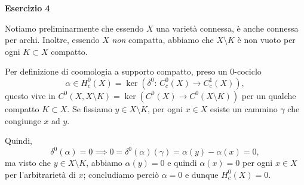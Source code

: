 \documentclass[a4paper]{article}
\theoremstyle{definition}
\theoremstyle{definition}
\theoremstyle{remark}
\theoremstyle{definition}
\begin{document}
\textbf{Esercizio 4}

Notiamo preliminarmente che essendo $X$ una varietà connessa, è anche connessa per archi. Inoltre, essendo $X$ \textit{non} compatta, abbiamo che $X\setminus K$ è non vuoto per ogni $K\subset X$ compatto.

Per definizione di coomologia a supporto compatto, preso un $0$-cociclo
\[
    \alpha\in H^0_c(X)=\ker{(\delta^0:\,C^0_c(X)\to C^1_c(X))}
,\]
questo vive in $C^0(X,X\setminus K )=\ker(C^0(X)\to C^0(X\setminus K))$ per un qualche compatto $K\subset X$. Se fissiamo $y\in X\setminus K$, per ogni $x\in X$ esiste un cammino $\gamma$ che congiunge
$x$ ad $y$.

Quindi,
\[
    \delta^0(\alpha)=0 \implies 0=\delta^0(\alpha)(\gamma)=\alpha(y)-\alpha(x)=0,
\] ma visto che $y\in X\setminus K$, abbiamo $\alpha(y)=0$ e quindi $\alpha(x)=0$ per ogni $x\in X$ per l'arbitrarietà di $x$; concludiamo perciò $\alpha=0$ e dunque $H^0_c(X)=0$.
\end{document}
